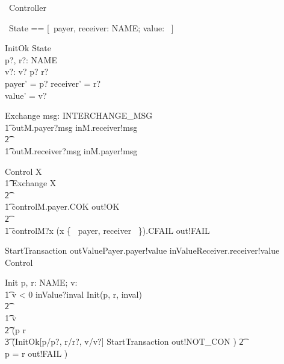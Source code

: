 \documentclass{article}
\begin{document}
\begin{circus}
      \circprocess\ Controller \circdef \circbegin
\end{circus}

\begin{circusaction}
     \circstate\ State == [~payer, receiver: NAME; value: \nat ~]
\end{circusaction}

\begin{schema}{InitOk}
     \Delta State \\
     p?, r?: NAME \\
     v?: \nat
\where
      v?  \land p? \neq r? \\
      payer' = p? \land receiver' = r? \\
      value' = v?      
\end{schema}

\begin{circusaction}
     Exchange \circdef \circvar msg: INTERCHANGE\_MSG \circspot \\
     	\t1 outM.payer?msg \then inM.receiver!msg \then \Skip \\
		\t2 \extchoice \\
	\t1 outM.receiver?msg \then inM.payer!msg \then \Skip
\end{circusaction}

\begin{circusaction}
     Control \circdef \circmu X \circspot \\
     	\t1 Exchange \circseq X \\
		\t2 \extchoice \\
	\t1 controlM.payer.COK \then out!OK \then \Skip \\
		\t2 \extchoice \\
	\t1 controlM?x \prefixcolon (x \in \{~ payer, receiver ~\}).CFAIL \then out!FAIL \then \Skip
\end{circusaction}

\begin{circusaction}
     StartTransaction \circdef outValuePayer.payer!value \then inValueReceiver.receiver!value \then Control
\end{circusaction}

\begin{circusaction}
     Init \circdef p, r: NAME; v: \nat \circspot \\
     	\t1 \lcircguard v < 0 \rcircguard \circguard inValue?inval \then Init(p, r, inval) \\
		\t2 \extchoice \\
	\t1 \lcircguard v  \rcircguard \circguard \\
		\t2 (\lcircguard p \neq r \rcircguard \circguard \\
				\t3 (\lschexpract InitOk[p/p?, r/r?, v/v?] \rschexpract \circseq StartTransaction \intchoice out!NOT\_CON \then \Skip)
			\t2 \extchoice \\
		     \lcircguard p = r \rcircguard \circguard out!FAIL \then \Skip)
\end{circusaction}
\end{document}
